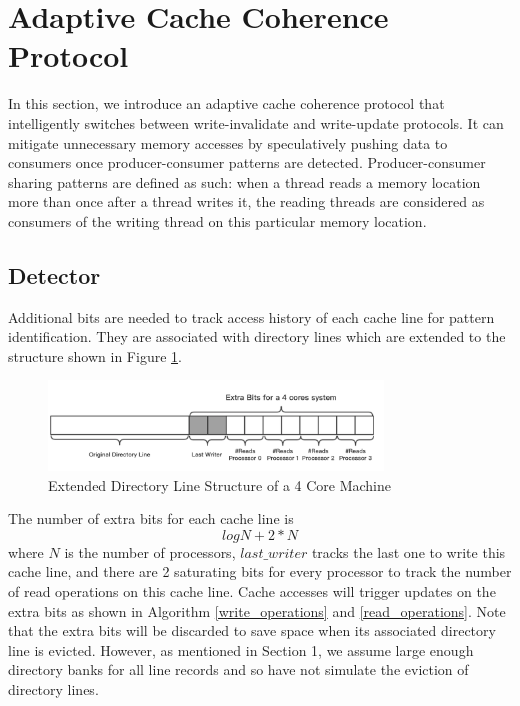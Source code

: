 \documentclass[11pt,conference]{IEEEtran}
\begin{document}
\section{Adaptive Cache Coherence Protocol}
In this section, we introduce an adaptive cache coherence protocol that intelligently switches between write-invalidate and write-update protocols. It can mitigate unnecessary memory accesses by speculatively pushing data to consumers once producer-consumer patterns are detected. Producer-consumer sharing patterns are defined as such: when a thread reads a memory location more than once after a thread writes it, the reading threads are considered as consumers of the writing thread on this particular memory location.


\subsection{Detector}

Additional bits are needed to track access history of each cache line for pattern identification. They are associated with directory lines which are extended to the structure shown in Figure \ref{dir_line}.

\begin{figure}[!h]
\centering
\captionsetup{justification=centering}
\includegraphics[width=3.5in]{dir_line.png}
\caption{Extended Directory Line Structure of a 4 Core Machine}
\label{dir_line}
\end{figure}
\FloatBarrier

The number of extra bits for each cache line is
\begin{equation*}
log N + 2 * N
\end{equation*}
where $N$ is the number of processors, $last\_writer$ tracks the last one to write this cache line, and there are 2 saturating bits for every processor to track the number of read operations on this cache line. Cache accesses will trigger updates on the extra bits as shown in Algorithm \ref{write_operations} and \ref{read_operations}. Note that the extra bits will be discarded to save space when its associated directory line is evicted. However, as mentioned in Section 1, we assume large enough directory banks for all line records and so have not simulate the eviction of directory lines.
\end{document}
